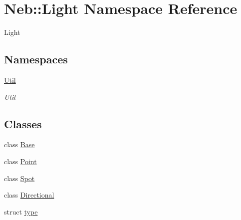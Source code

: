 \hypertarget{namespaceNeb_1_1Light}{\section{Neb\-:\-:Light Namespace Reference}
\label{namespaceNeb_1_1Light}
}


Light  


\subsection*{Namespaces}
\begin{DoxyCompactItemize}
\item 
\hyperlink{namespaceNeb_1_1Light_1_1Util}{Util}
\begin{DoxyCompactList}\small\item\em Util \end{DoxyCompactList}\end{DoxyCompactItemize}
\subsection*{Classes}
\begin{DoxyCompactItemize}
\item 
class \hyperlink{classNeb_1_1Light_1_1Base}{Base}
\item 
class \hyperlink{classNeb_1_1Light_1_1Point}{Point}
\item 
class \hyperlink{classNeb_1_1Light_1_1Spot}{Spot}
\item 
class \hyperlink{classNeb_1_1Light_1_1Directional}{Directional}
\item 
struct \hyperlink{structNeb_1_1Light_1_1type}{type}
\end{DoxyCompactItemize}
